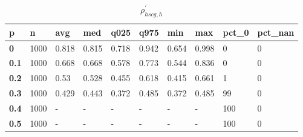 \begin{table}[h]
 \centering 
\footnotesize
\caption{$\rho_{hscg,h}^\prime $}
\label{tab:alphahscgh}
\begin{tabular}[h]{|l|l|l|l|l|l|l|l|l|l|
    } \hline
\textbf{ p} & \textbf{ n} & \textbf{ avg} & \textbf{ med} & \textbf{ q025} & \textbf{ q975} & \textbf{ min} & \textbf{ max} & \textbf{ pct\_0} & \textbf{ pct\_nan}
    \\ \hline
  \textbf{  0} & 1000 & 0.818 & 0.815 & 0.718 & 0.942 & 0.654 & 0.998 &   0 & 0
    \\ \hline
  \textbf{0.1} & 1000 & 0.668 & 0.668 & 0.578 & 0.773 & 0.544 & 0.836 &   0 & 0
    \\ \hline
  \textbf{0.2} & 1000 &  0.53 & 0.528 & 0.455 & 0.618 & 0.415 & 0.661 &   1 & 0
    \\ \hline
  \textbf{0.3} & 1000 & 0.429 & 0.443 & 0.372 & 0.485 & 0.372 & 0.485 &  99 & 0
    \\ \hline
  \textbf{0.4} & 1000 & - & - & - & - & - & - & 100 & 0
    \\ \hline
  \textbf{0.5} & 1000 & - & - & - & - & - & - & 100 & 0
    \\ \hline
 \end{tabular}
 \end{table}
